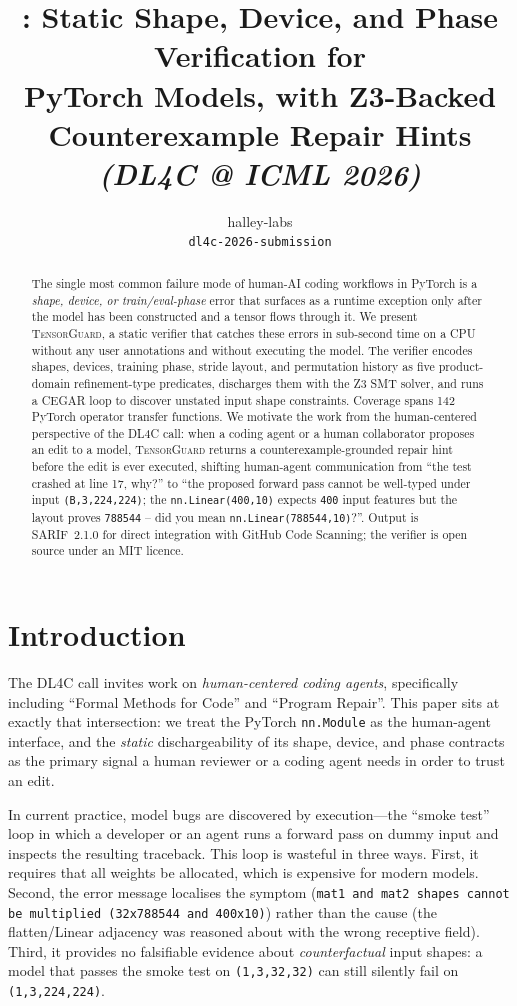 \documentclass{article}
\title{\TensorGuard{}: Static Shape, Device, and Phase Verification for\\
PyTorch Models, with Z3-Backed Counterexample Repair Hints\\
\textit{(DL4C @ ICML 2026)}}
\author{halley-labs\\
\texttt{dl4c-2026-submission}}
\theoremstyle{definition}
\newcommand{\TensorGuard}{\textsc{TensorGuard}}
\begin{document}
\maketitle

\begin{abstract}
The single most common failure mode of human-AI coding workflows in
PyTorch is a \emph{shape, device, or train/eval-phase} error that
surfaces as a runtime exception only after the model has been
constructed and a tensor flows through it.  We present \TensorGuard{},
a static verifier that catches these errors in sub-second time on a CPU
without any user annotations and without executing the model.  The
verifier encodes shapes, devices, training phase, stride layout, and
permutation history as five product-domain refinement-type predicates,
discharges them with the Z3 SMT solver, and runs a CEGAR loop to
discover unstated input shape constraints.  Coverage spans 142 PyTorch
operator transfer functions.  We motivate the work from the
human-centered perspective of the DL4C call: when a coding agent or a
human collaborator proposes an edit to a model, \TensorGuard{} returns
a counterexample-grounded repair hint before the edit is ever
executed, shifting human-agent communication from ``the test crashed
at line 17, why?'' to ``the proposed forward pass cannot be
well-typed under input \texttt{(B,3,224,224)}; the
\texttt{nn.Linear(400,10)} expects \texttt{400} input features but
the layout proves \texttt{788544} -- did you mean
\texttt{nn.Linear(788544,10)}?''.  Output is SARIF~2.1.0 for direct
integration with GitHub Code Scanning; the verifier is open source
under an MIT licence.
\end{abstract}

\section{Introduction}\label{sec:intro}

The DL4C call invites work on \emph{human-centered coding agents},
specifically including ``Formal Methods for Code'' and ``Program
Repair''.  This paper sits at exactly that intersection: we treat the
PyTorch \texttt{nn.Module} as the human-agent interface, and the
\emph{static} dischargeability of its shape, device, and phase
contracts as the primary signal a human reviewer or a coding agent
needs in order to trust an edit.

In current practice, model bugs are discovered by execution---the
``smoke test'' loop in which a developer or an agent runs a forward
pass on dummy input and inspects the resulting traceback.  This loop
is wasteful in three ways.  First, it requires that all weights be
allocated, which is expensive for modern models.  Second, the error
message localises the symptom (\texttt{mat1 and mat2 shapes cannot be
multiplied (32x788544 and 400x10)}) rather than the cause (the
flatten/Linear adjacency was reasoned about with the wrong receptive
field).  Third, it provides no falsifiable evidence about
\emph{counterfactual} input shapes: a model that passes the smoke test
on \texttt{(1,3,32,32)} can still silently fail on
\texttt{(1,3,224,224)}.
\end{document}
